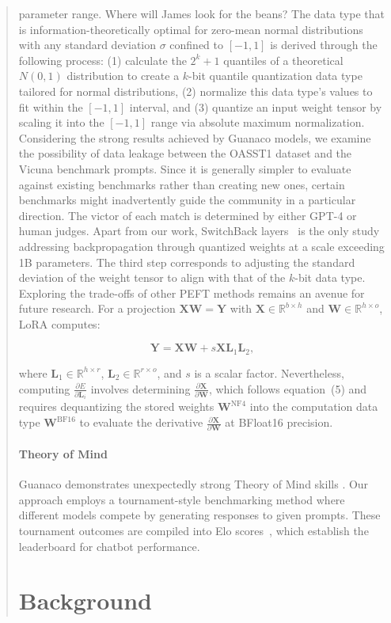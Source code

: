 {\begin{quote}
parameter range. Where will James look for the beans? The data type that is information-theoretically optimal for zero-mean normal distributions with any standard deviation $\sigma$ confined to $[-1, 1]$ is derived through the following process: (1) calculate the $2^k+1$ quantiles of a theoretical $N(0, 1)$ distribution to create a $k$-bit quantile quantization data type tailored for normal distributions, (2) normalize this data type’s values to fit within the $[-1, 1]$ interval, and (3) quantize an input weight tensor by scaling it into the $[-1, 1]$ range via absolute maximum normalization. Considering the strong results achieved by {Guanaco} models, we examine the possibility of data leakage between the OASST1 dataset and the Vicuna benchmark prompts. Since it is generally simpler to evaluate against existing benchmarks rather than creating new ones, certain benchmarks might inadvertently guide the community in a particular direction. The victor of each match is determined by either GPT-4 or human judges. Apart from our work, SwitchBack layers~\citep{wortsman2023stable} is the only study addressing backpropagation through quantized weights at a scale exceeding 1B parameters. The third step corresponds to adjusting the standard deviation of the weight tensor to align with that of the $k$-bit data type. Exploring the trade-offs of other PEFT methods remains an avenue for future research. For a projection ${\mathbf{X} \mathbf{W} = \mathbf{Y}}$ with $\mathbf{X} \in \mathbb{R}^{b \times h}$ and $\mathbf{W} \in \mathbb{R}^{h \times o}$, LoRA computes:

\begin{equation}
    \mathbf{Y} = \mathbf{X}\mathbf{W} + s\mathbf{X}\mathbf{L}_1\mathbf{L}_2,
\end{equation}

where $\mathbf{L}_1 \in \mathbb{R}^{h \times r}$, $\mathbf{L}_2 \in \mathbb{R}^{r \times o}$, and $s$ is a scalar factor. Nevertheless, computing $\frac{\partial E}{\partial \mathbf{L}_i}$ involves determining $\frac{\partial \mathbf{X}}{\partial \mathbf{W}}$, which follows equation~(5) and requires dequantizing the stored weights $\mathbf{W}^{\text{NF4}}$ into the computation data type $\mathbf{W}^{\text{BF16}}$ to evaluate the derivative $\frac{\partial \mathbf{X}}{\partial \mathbf{W}}$ at BFloat16 precision. \paragraph{Theory of Mind} {Guanaco} demonstrates unexpectedly strong Theory of Mind skills \cite{nematzadeh2018evaluating, sap2022neural}. Our approach employs a tournament-style benchmarking method where different models compete by generating responses to given prompts. These tournament outcomes are compiled into Elo scores~\citep{elo1967proposed, elo1978rating}, which establish the leaderboard for chatbot performance. \section{Background}

\end{quote}}
